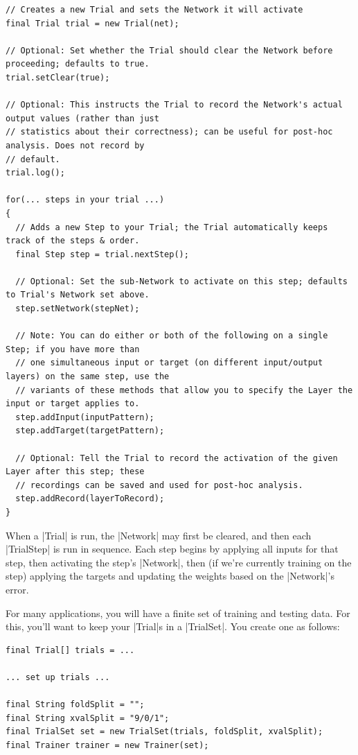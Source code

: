 \documentclass{article}
\begin{document}
\begin{verbatim}
// Creates a new Trial and sets the Network it will activate
final Trial trial = new Trial(net);

// Optional: Set whether the Trial should clear the Network before proceeding; defaults to true.
trial.setClear(true);

// Optional: This instructs the Trial to record the Network's actual output values (rather than just
// statistics about their correctness); can be useful for post-hoc analysis. Does not record by
// default.
trial.log();

for(... steps in your trial ...)
{
  // Adds a new Step to your Trial; the Trial automatically keeps track of the steps & order.
  final Step step = trial.nextStep();
  
  // Optional: Set the sub-Network to activate on this step; defaults to Trial's Network set above.
  step.setNetwork(stepNet); 
  
  // Note: You can do either or both of the following on a single Step; if you have more than
  // one simultaneous input or target (on different input/output layers) on the same step, use the
  // variants of these methods that allow you to specify the Layer the input or target applies to.
  step.addInput(inputPattern);
  step.addTarget(targetPattern);
  
  // Optional: Tell the Trial to record the activation of the given Layer after this step; these
  // recordings can be saved and used for post-hoc analysis.
  step.addRecord(layerToRecord);
}
\end{verbatim}


When a  |Trial| is run, the |Network| may first be cleared, and then each  |TrialStep| is run in sequence.
Each step begins by applying all inputs for that step, then activating the step's |Network|, then (if
we're currently training on the step) applying the targets and updating the weights based on the
|Network|'s error.

For many applications, you will have a finite set of training and testing data. For this, you'll
want to keep your  |Trial|s in a  |TrialSet|. You create one as follows:


\begin{verbatim}
final Trial[] trials = ...
 
... set up trials ...

final String foldSplit = "";
final String xvalSplit = "9/0/1";
final TrialSet set = new TrialSet(trials, foldSplit, xvalSplit);
final Trainer trainer = new Trainer(set);
\end{verbatim}
\end{document}
